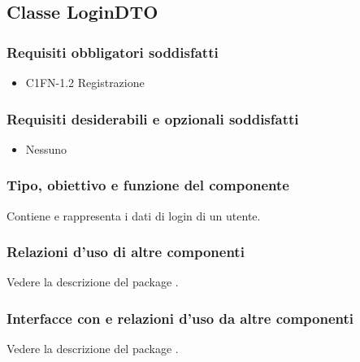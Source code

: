 \subsection{Classe LoginDTO}
\subsubsection*{Requisiti obbligatori soddisfatti}
\begin{itemize}
	\item C1FN-1.2 Registrazione
\end{itemize}
\subsubsection*{Requisiti desiderabili e opzionali soddisfatti}
\begin{itemize}
    \item Nessuno
\end{itemize}
\subsubsection*{Tipo, obiettivo e funzione del componente}
Contiene e rappresenta i dati di login di un utente.
\subsubsection*{Relazioni d'uso di altre componenti}
Vedere la descrizione del package .
\subsubsection*{Interfacce con e relazioni d'uso da altre componenti}
Vedere la descrizione del package .

